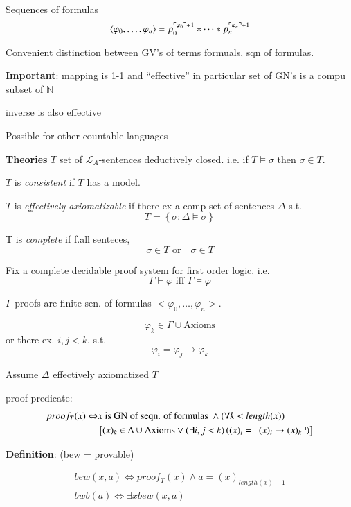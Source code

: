 \documentclass[12pt]{article}
\newcommand{\Nat}{\ensuremath{\mathbb{N}}}
\newcommand{\defn}{\textbf{Definition}: }
\begin{document}
Sequences of formulas
\[
 \langle \varphi_0, \dots, \varphi_n \rangle 
 = p_0^{\ulcorner \varphi_0 \urcorner + 1} * \dots * p_n^{\ulcorner \varphi_n \urcorner + 1}
\]

Convenient distinction between GV's of terms formuals, sqn of formulas.

\textbf{Important}: mapping is 1-1 and ``effective''
in particular set of GN's is a compu subset of $\Nat$

inverse is also effective

Possible for other countable languages


\textbf{Theories}
$T$ set of $\mathcal{L}_A$-sentences deductively closed.  
i.e. if $T \models \sigma$ then $\sigma \in T$.


$T$ is \emph{consistent} if $T$ has a model.

$T$ is \emph{effectively axiomatizable} if there ex a comp set of sentences 
$\Delta$ s.t.
\[
T = \left\{\sigma : \Delta \models \sigma \right\}
\]

T is \emph{complete} if f.all senteces,
\[
\sigma \in T \text{ or } \neg \sigma \in T
\]

Fix a complete decidable proof system for first order logic.
i.e.
\newcommand{\proves}{\vdash}
\[
\Gamma \proves \varphi \text{ iff } \Gamma \models \varphi
\]

$\Gamma$-proofs are finite sen. of formulas $<\varphi_0, \dots, \varphi_n >$.

\[
\varphi_k \in \Gamma \cup \text{Axioms}
\]
or there ex. $i,j < k$, s.t.
\[
\varphi_i = \varphi_j \rightarrow \varphi_k
\]

Assume $\Delta$ effectively axiomatized $T$

proof predicate:
\begin{align*}
  proof_T(x) \Leftrightarrow& x \text{ is GN of seqn. of formulas } 
  \wedge (\forall k < length(x) ) \\
  &\left[ (x)_k \in \Delta \cup \text{Axioms} \vee (\exists i,j < k) \left( (x)_i = \ulcorner (x)_i \rightarrow (x)_k \urcorner\right) \right]
\end{align*}

\defn
(bew = provable)

\begin{align*}
  bew(x,a) \Leftrightarrow proof_T(x) \wedge a =  (x)_{length(x)-1} \\
  bwb(a) \Leftrightarrow \exists x bew(x,a)
\end{align*}
\end{document}
